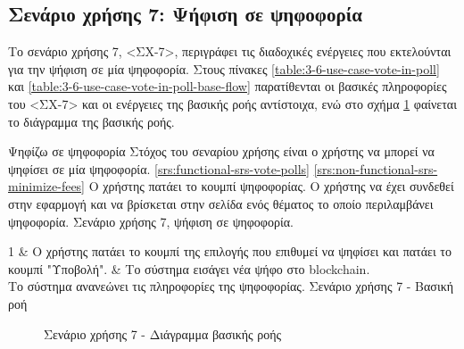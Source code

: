 \subsection{Σενάριο χρήσης 7: Ψήφιση σε ψηφοφορία} \label{subsection:3-6-use-case-vote-in-poll}

Το σενάριο χρήσης 7, <ΣΧ-7>, περιγράφει τις διαδοχικές ενέργειες που εκτελούνται για την ψήφιση σε μία ψηφοφορία. Στους πίνακες \ref{table:3-6-use-case-vote-in-poll} και \ref{table:3-6-use-case-vote-in-poll-base-flow} παρατίθενται οι βασικές πληροφορίες του <ΣΧ-7> και οι ενέργειες της βασικής ροής αντίστοιχα, ενώ στο σχήμα \ref{figure:3-6-use-case-vote-in-poll-base-flow-sequence-diagram} φαίνεται το διάγραμμα της βασικής ροής.

\useCaseTable
{Ψηφίζω σε ψηφοφορία}
{Στόχος του σεναρίου χρήσης είναι ο χρήστης να μπορεί να ψηφίσει σε μία ψηφοφορία.}
{\ref{srs:functional-srs-vote-polls}}
{\ref{srs:non-functional-srs-minimize-fees}}
{Ο χρήστης πατάει το κουμπί ψηφοφορίας.}
{Ο χρήστης να έχει συνδεθεί στην εφαρμογή και να βρίσκεται στην σελίδα ενός θέματος το οποίο περιλαμβάνει ψηφοφορία.}
{Σενάριο χρήσης 7, ψήφιση σε ψηφοφορία.}
{\label{table:3-6-use-case-vote-in-poll}}


\useCaseBaseFlowTable
{
    1 & Ο χρήστης πατάει το κουμπί της επιλογής που επιθυμεί να ψηφίσει και πατάει το κουμπί "Υποβολή". & Το σύστημα εισάγει νέα ψήφο στο blockchain. \\ [0.5ex]
}
{Το σύστημα ανανεώνει τις πληροφορίες της ψηφοφορίας.}
{Σενάριο χρήσης 7 - Βασική ροή}
{\label{table:3-6-use-case-vote-in-poll-base-flow}}

\begin{figure}[H]
    \centering
    
    \caption{Σενάριο χρήσης 7 - Διάγραμμα βασικής ροής}
    \label{figure:3-6-use-case-vote-in-poll-base-flow-sequence-diagram}
\end{figure}
